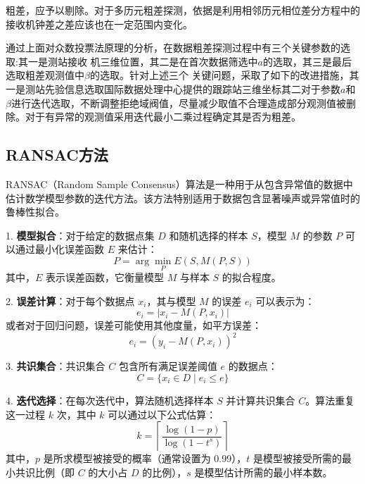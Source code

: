 \documentclass[12pt,hyperref,a4paper,UTF8]{ctexart}
\begin{document}
粗差，应予以剔除。对于多历元粗差探测，依据是利用相邻历元相位差分方程中的接收机钟差之差应该也在一定范围内变化。

通过上面对众数投票法原理的分析，在数据粗差探测过程中有三个关键参数的选取:其一是测站接收
机三维位置，其二是在首次数据筛选中$a$的选取，其三是最后选取粗差观测值中$\beta$的选取。针对上述三个
关键问题，采取了如下的改进措施，其一是测站先验信息选取国际数据处理中心提供的跟踪站三维坐标其二对于参数$a$和$\beta$进行迭代选取，不断调整拒绝域阀值，尽量减少取值不合理造成部分观测值被删除。对于有异常的观测值采用迭代最小二乘过程确定其是否为粗差\cite{WHCH200203003}。

\subsection{RANSAC方法}
RANSAC（Random Sample Consensus）算法是一种用于从包含异常值的数据中估计数学模型参数的迭代方法。该方法特别适用于数据包含显著噪声或异常值时的鲁棒性拟合。

1. \textbf{模型拟合}：对于给定的数据点集 \( D \) 和随机选择的样本 \( S \)，模型 \( M \) 的参数 \( P \) 可以通过最小化误差函数 \( E \) 来估计：
\begin{equation}
    P = \arg\min_{P} E(S, M(P, S))
\end{equation}
其中，\( E \) 表示误差函数，它衡量模型 \( M \) 与样本 \( S \) 的拟合程度。

2. \textbf{误差计算}：对于每个数据点 \( x_i \)，其与模型 \( M \) 的误差 \( e_i \) 可以表示为：
\begin{equation}
    e_i = |x_i - M(P, x_i)|
\end{equation}
或者对于回归问题，误差可能使用其他度量，如平方误差：
\begin{equation}
    e_i = (y_i - M(P, x_i))^2
\end{equation}

3. \textbf{共识集合}：共识集合 \( C \) 包含所有满足误差阈值 \( e \) 的数据点：
\begin{equation}
    C = \{ x_i \in D \mid e_i \leq e \}
\end{equation}

4. \textbf{迭代选择}：在每次迭代中，算法随机选择样本 \( S \) 并计算共识集合 \( C \)。算法重复这一过程 \( k \) 次，其中 \( k \) 可以通过以下公式估算：
\begin{equation}
    k = \left\lceil \frac{\log(1 - p)}{\log(1 - t^s)} \right\rceil
\end{equation}
其中，\( p \) 是所求模型被接受的概率（通常设置为 0.99），\( t \) 是模型被接受所需的最小共识比例（即 \( C \) 的大小占 \( D \) 的比例），\( s \) 是模型估计所需的最小样本数。
\end{document}
